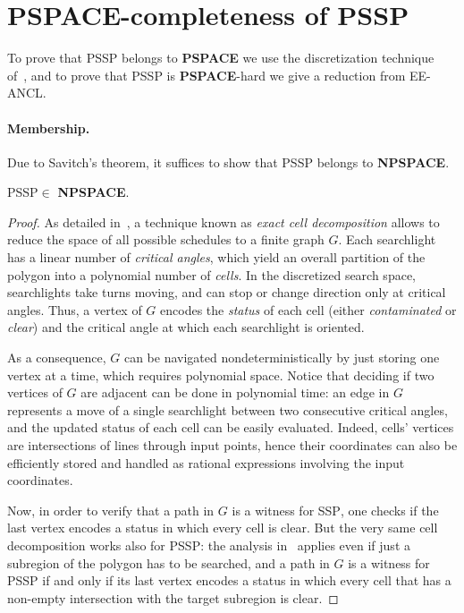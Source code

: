 \documentclass{style}
\newcommand{\complexityclass}[1]{\textbf{#1}}
\newcommand{\computproblem}[1]{\textsc{#1}}
\newcommand{\PSPACE}{\complexityclass{PSPACE}\xspace}
\newcommand{\NPSPACE}{\complexityclass{NPSPACE}\xspace}
\newcommand{\EEANCL}{\computproblem{EE-ANCL}\xspace}
\newcommand{\SSP}{\computproblem{SSP}\xspace}
\newcommand{\PSSP}{\computproblem{PSSP}\xspace}
\begin{document}
\section{\PSPACE-completeness of \PSSP}

To prove that \PSSP belongs to \PSPACE we use the discretization technique of~\cite{bullo}, and to prove that \PSSP is \PSPACE-hard we give a reduction from \EEANCL.

\paragraph{Membership.}

Due to Savitch's theorem, it suffices to show that \PSSP belongs to \NPSPACE.

\begin{lemma} \label{lemma1}
\PSSP $\in$ \NPSPACE.
\end{lemma}
\begin{proof}
As detailed in~\cite{bullo}, a technique known as \emph{exact cell decomposition} allows to reduce the space of all possible schedules to a finite graph $G$. Each searchlight has a linear number of \emph{critical angles}, which yield an overall partition of the polygon into a polynomial number of \emph{cells}. In the discretized search space, searchlights take turns moving, and can stop or change direction only at critical angles. Thus, a vertex of $G$ encodes the \emph{status} of each cell (either \emph{contaminated} or \emph{clear}) and the critical angle at which each searchlight is oriented.

As a consequence, $G$ can be navigated nondeterministically by just storing one vertex at a time, which requires polynomial space. Notice that deciding if two vertices of $G$ are adjacent can be done in polynomial time: an edge in $G$ represents a move of a single searchlight between two consecutive critical angles, and the updated status of each cell can be easily evaluated. Indeed, cells' vertices are intersections of lines through input points, hence their coordinates can also be efficiently stored and handled as rational expressions involving the input coordinates.

Now, in order to verify that a path in $G$ is a witness for \SSP, one checks if the last vertex encodes a status in which every cell is clear. But the very same cell decomposition works also for \PSSP: the analysis in~\cite{bullo} applies even if just a subregion of the polygon has to be searched, and a path in $G$ is a witness for \PSSP if and only if its last vertex encodes a status in which every cell that has a non-empty intersection with the target subregion is clear.
\end{proof}
\end{document}
